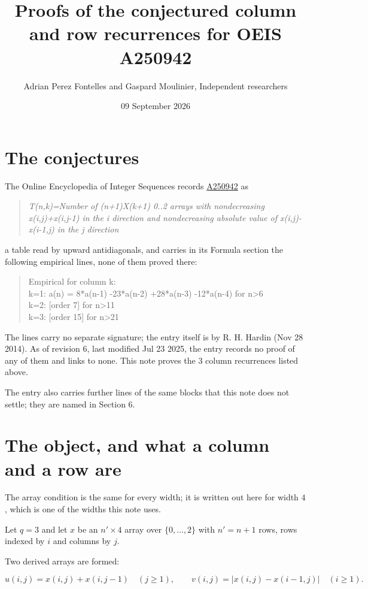 \documentclass[11pt]{article}
\title{Proofs of the conjectured column and row recurrences for OEIS A250942}
\author{Adrian Perez Fontelles and Gaspard Moulinier, Independent researchers}
\date{09 September 2026}
\theoremstyle{definition}
\begin{document}
\maketitle
\section{The conjectures}

The Online Encyclopedia of Integer Sequences records \href{https://oeis.org/A250942}{A250942} as

\begin{quote}\itshape T(n,k)=Number of (n+1)X(k+1) 0..2 arrays with nondecreasing x(i,j)+x(i,j-1) in the i direction and nondecreasing absolute value of x(i,j)-x(i-1,j) in the j direction\end{quote}

a table read by upward antidiagonals, and carries in its Formula section the following empirical lines, none of them proved there:

\begin{quote}\ttfamily Empirical for column k:\\
k=1: a(n) = 8*a(n-1) -23*a(n-2) +28*a(n-3) -12*a(n-4) for n>6\\k=2: [order 7] for n>11\\k=3: [order 15] for n>21\end{quote}

The lines carry no separate signature; the entry itself is by R. H. Hardin (Nov 28 2014). As of revision 6, last modified Jul 23 2025, the entry records no proof of any of them and links to none. This note proves the 3 column recurrences listed above.

The entry also carries further lines of the same blocks that this note does not settle; they are named in Section 6.

\section{The object, and what a column and a row are}

The array condition is the same for every width; it is written out here for width $4$, which is one of the widths this note uses.

Let $q = 3$ and let $x$ be an $n' \times 4$ array over $\{0,\dots,2\}$ with $n' = n + 1$ rows, rows indexed by $i$ and columns by $j$.

Two derived arrays are formed:

\[u(i,j) = x(i,j) + x(i,j{-}1)\quad (j \ge 1), \qquad v(i,j) = \lvert x(i,j) - x(i{-}1,j)\rvert\quad (i \ge 1).\]
\end{document}
